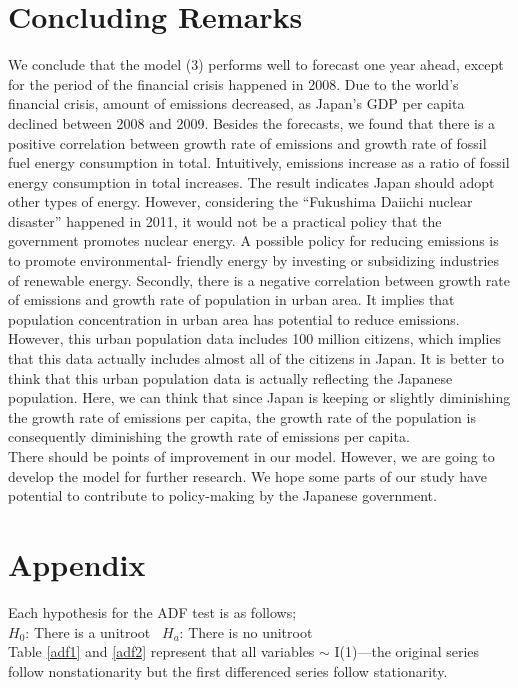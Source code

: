 \documentclass[12pt, a4paper]{article}
\begin{document}
\section{Concluding Remarks}
We conclude that the model (3) performs well to forecast one year ahead, except for the period of the financial crisis happened in 2008. Due to the world’s financial crisis, amount of  emissions decreased, as Japan’s GDP per capita declined between 2008 and 2009.
 Besides the forecasts, we found that there is a positive correlation between growth rate of  emissions and growth rate of fossil fuel energy consumption in total. Intuitively,  emissions increase as a ratio of fossil energy consumption in total increases. The result indicates Japan should adopt other types of energy. However, considering the “Fukushima Daiichi nuclear disaster” happened in 2011, it would not be a practical policy that the government promotes nuclear energy. A possible policy for reducing  emissions is to promote environmental- friendly energy by investing or subsidizing industries of renewable energy. Secondly, there is a negative correlation between growth rate of  emissions and growth rate of population in urban area. It implies that population concentration in urban area has potential to reduce  emissions.  However, this urban population data includes 100 million citizens, which implies that this data actually includes almost all of the citizens in Japan.  It is better to think that this urban population data is actually reflecting the Japanese population.  Here, we can think that since Japan is keeping or slightly diminishing the growth rate of  emissions per capita, the growth rate of the population is consequently diminishing the growth rate of  emissions per capita.\\
 There should be points of improvement in our model. However, we are going to develop the model for further research. We hope some parts of our study have potential to contribute to policy-making by the Japanese government.     


\newpage

\section{Appendix}

Each hypothesis for the ADF test is as follows;\\
$H_0$: There is a unitroot \ $H_a$: There is no unitroot\\
Table \ref{adf1} and \ref{adf2} represent that all variables $\sim$ I(1)---the original series follow nonstationarity but the first differenced series follow stationarity.\\
\end{document}
